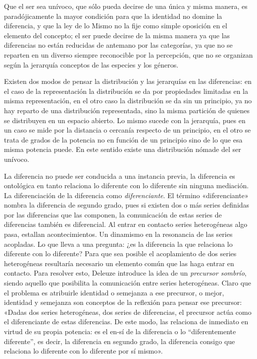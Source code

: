 Que el ser sea unívoco, que sólo pueda decirse de una única y misma manera, es paradójicamente la mayor condición para que la identidad no domine la diferencia, y que la ley de lo Mismo no la fije como simple oposición en el elemento del concepto; el ser puede decirse de la misma manera ya que las diferencias no están reducidas de antemano por las categorías, ya que no se reparten en un diverso siempre reconocible por la percepción, que no se organizan según la jerarquía conceptos de las especies y los géneros.

Existen dos modos de pensar la distribución y las jerarquías en las diferencias: en el caso de la representación la distribución se da por propiedades limitadas en la misma representación, en el otro caso la distribución se da sin un principio, ya no hay reparto de una distribución representada, sino la misma partición de quienes se distribuyen en un espacio abierto. Lo mismo sucede con la jerarquía, pues en un caso se mide por la distancia o cercanía respecto de un principio, en el otro se trata de grados de la potencia no en función de un principio sino de lo que esa misma potencia puede. En este sentido existe una distribución nómade del ser unívoco.

La diferencia no puede ser conducida a una instancia previa, la diferencia es ontológica en tanto relaciona lo diferente con lo diferente sin ninguna mediación. La diferenciación de la diferencia como \emph{diferenciante}. El término «diferenciante» nombra la diferencia de segundo grado, pues si existen dos o más series definidas por las diferencias que las componen, la comunicación de estas series de diferencias también es diferencial. Al entrar en contacto series heterogéneas algo pasa, estallan acontecimientos. Un dinamismo en la resonancia de las series acopladas. Lo que lleva a una pregunta: ¿es la diferencia la que relaciona lo diferente con lo diferente? Para que sea posible el acoplamiento de dos series heterogéneas resultaría necesario un elemento común que las haga entrar en contacto. Para resolver esto, Deleuze introduce la idea de un \emph{precursor sombrío}, siendo aquello que posibilita la comunicación entre series heterogéneas. Claro que el problema es atribuirle identidad o semejanza a ese precursor, o mejor, identidad y semejanza son conceptos de la reflexión para pensar ese precursor: «Dadas dos series heterogéneas, dos series de diferencias, el precursor actúa como el diferenciante de estas diferencias. De este modo, las relaciona de inmediato en virtud de su propia potencia: es el en-sí de la diferencia o lo ``diferentemente diferente'', es decir, la diferencia en segundo grado, la diferencia consigo que relaciona lo diferente con lo diferente por sí mismo».

